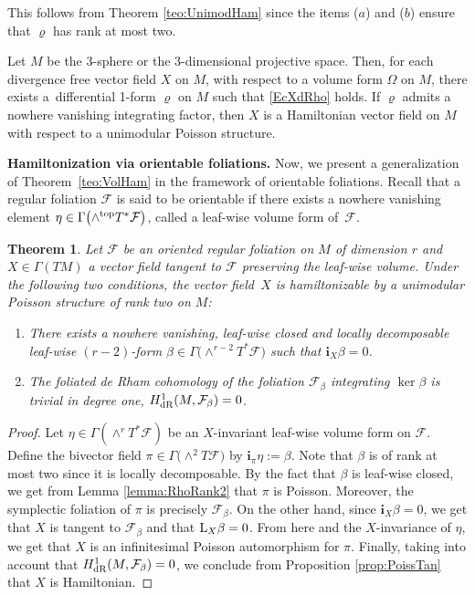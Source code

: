 \documentclass[10pt,a4paper]{amsart}
\newcommand{\ii}{\mathbf{i}}
\numberwithin{equation}{section}
\newtheorem{Theorem}{Theorem}[section]
\begin{document}
This follows from Theorem \ref{teo:UnimodHam} since the items ($a$) and ($b$) ensure that $\varrho$ has rank at most two.

\begin{Example}
Let $M$ be the 3-sphere or the 3-dimensional projective space. Then, for each divergence free vector field $X$ on $M$, with respect to a volume form $\Omega$ on $M$, there exists a~differential 1-form $\varrho$ on $M$ such that \eqref{EcXdRho} holds. If $\varrho$ admits a nowhere vanishing integrating factor, then $X$ is a Hamiltonian vector field on $M$ with respect to a unimodular Poisson structure.
\end{Example}

{\bf Hamiltonization via orientable foliations.} Now, we present a generalization of Theorem~\ref{teo:VolHam} in the framework of orientable foliations. Recall that a regular foliation $\mathcal{F}$ is said to be orientable if there exists a nowhere vanishing element $\eta \in \Gamma\big({\wedge}^{{\rm top}}T^{\ast}\mathcal{F}\big)$, called a leaf-wise volume form of~$\mathcal{F}$.

\begin{Theorem}\label{teo:DoubleFol}
Let $\mathcal{F}$ be an oriented regular foliation on $M$ of dimension $r$ and $X \in \Gamma(TM)$ a vector field tangent to $\mathcal{F}$ preserving the leaf-wise volume. Under the following two conditions, the vector field~$X$ is hamiltonizable by a unimodular Poisson structure of rank two on $M$:
 \begin{enumerate}\itemsep=0pt
 \item[$1.$] There exists a nowhere vanishing, leaf-wise closed and locally decomposable leaf-wise $(r-2)$-form $\beta \in \Gamma\big({\wedge}^{r-2}T^{*}\mathcal{F}\big)$ such that $\ii_{X}\beta = 0$.

 \item[$2.$] The foliated de Rham cohomology of the foliation $\mathcal{F}_{\beta}$ integrating $\ker\beta$ is trivial in degree one, $H^{1}_{{\rm dR}}(M,\mathcal{F}_{\beta}) = 0$.
 \end{enumerate}
\end{Theorem}

\begin{proof}
Let $\eta \in \Gamma(\wedge^{r}T^{*}\mathcal{F})$ be an $X$-invariant leaf-wise volume form on $\mathcal{F}$. Define the bivector field $\pi \in \Gamma\big({\wedge}^{2}T\mathcal{F}\big)$ by $\ii_{\pi}\eta := \beta$. Note that $\beta$ is of rank at most two since it is locally decomposable. By the fact that $\beta$ is leaf-wise closed, we get from Lemma \ref{lemma:RhoRank2} that $\pi$ is Poisson. Moreover, the symplectic foliation of $\pi$ is precisely $\mathcal{F}_{\beta}$. On the other hand, since $\ii_{X}\beta = 0$, we get that $X$ is tangent to $\mathcal{F}_{\beta}$ and that ${\rm L}_{X}\beta = 0$. From here and the $X$-invariance of $\eta$, we get that $X$ is an infinitesimal Poisson automorphism for $\pi$. Finally, taking into account that $H^{1}_{{\rm dR}}(M,\mathcal{F}_{\beta}) = 0$, we conclude from Proposition \ref{prop:PoissTan} that $X$ is Hamiltonian.
\end{proof}
\end{document}
